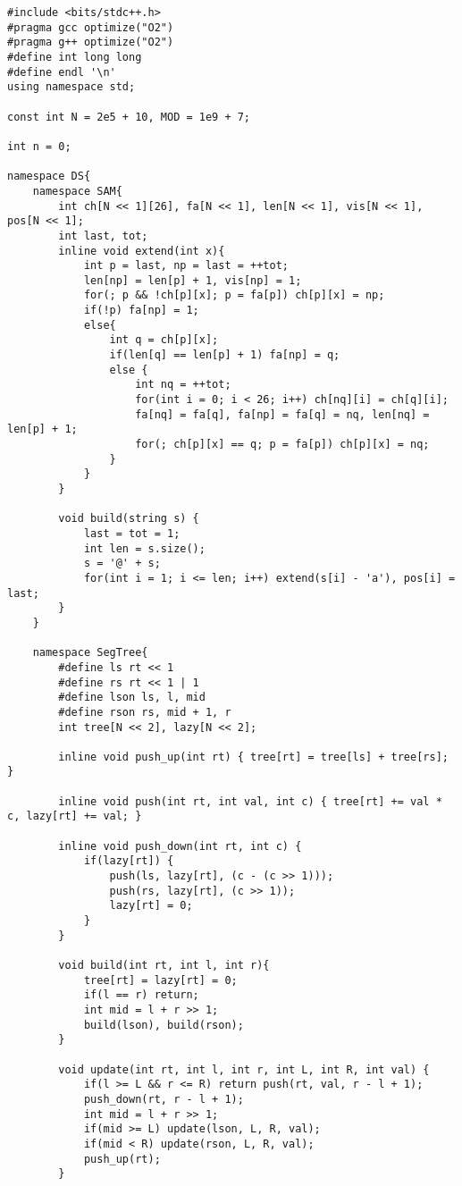\documentclass[]{article}
\begin{document}
\begin{verbatim}
#include <bits/stdc++.h>
#pragma gcc optimize("O2")
#pragma g++ optimize("O2")
#define int long long
#define endl '\n'
using namespace std;

const int N = 2e5 + 10, MOD = 1e9 + 7;

int n = 0;

namespace DS{
    namespace SAM{
        int ch[N << 1][26], fa[N << 1], len[N << 1], vis[N << 1], pos[N << 1];
        int last, tot;
        inline void extend(int x){ 
            int p = last, np = last = ++tot;
            len[np] = len[p] + 1, vis[np] = 1;
            for(; p && !ch[p][x]; p = fa[p]) ch[p][x] = np;
            if(!p) fa[np] = 1;
            else{
                int q = ch[p][x];
                if(len[q] == len[p] + 1) fa[np] = q;
                else {
                    int nq = ++tot;
                    for(int i = 0; i < 26; i++) ch[nq][i] = ch[q][i];
                    fa[nq] = fa[q], fa[np] = fa[q] = nq, len[nq] = len[p] + 1;
                    for(; ch[p][x] == q; p = fa[p]) ch[p][x] = nq;
                }
            }
        }   

        void build(string s) {
            last = tot = 1;
            int len = s.size();
            s = '@' + s;
            for(int i = 1; i <= len; i++) extend(s[i] - 'a'), pos[i] = last;
        }
    }

    namespace SegTree{
        #define ls rt << 1
        #define rs rt << 1 | 1
        #define lson ls, l, mid
        #define rson rs, mid + 1, r
        int tree[N << 2], lazy[N << 2];
      
        inline void push_up(int rt) { tree[rt] = tree[ls] + tree[rs]; }

        inline void push(int rt, int val, int c) { tree[rt] += val * c, lazy[rt] += val; }

        inline void push_down(int rt, int c) {
            if(lazy[rt]) {
                push(ls, lazy[rt], (c - (c >> 1)));
                push(rs, lazy[rt], (c >> 1));
                lazy[rt] = 0;
            }
        }

        void build(int rt, int l, int r){
            tree[rt] = lazy[rt] = 0;
            if(l == r) return;
            int mid = l + r >> 1;
            build(lson), build(rson);
        }

        void update(int rt, int l, int r, int L, int R, int val) {
            if(l >= L && r <= R) return push(rt, val, r - l + 1);
            push_down(rt, r - l + 1);
            int mid = l + r >> 1;
            if(mid >= L) update(lson, L, R, val);
            if(mid < R) update(rson, L, R, val);
            push_up(rt);
        }


\end{verbatim}
\end{document}
